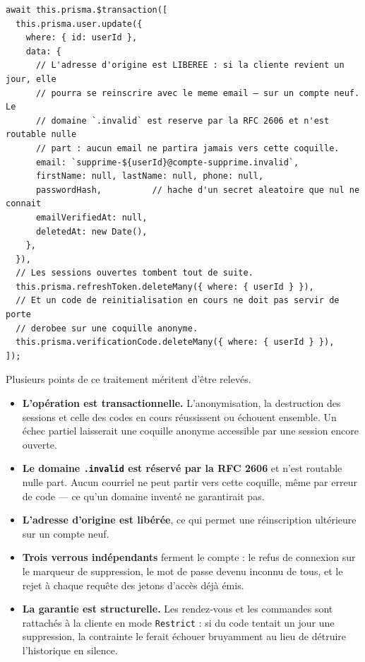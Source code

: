 \begin{lstlisting}[caption={Anonymisation d'un compte : ce qui est effacé, ce qui survit},captionpos=b]
await this.prisma.$transaction([
  this.prisma.user.update({
    where: { id: userId },
    data: {
      // L'adresse d'origine est LIBEREE : si la cliente revient un jour, elle
      // pourra se reinscrire avec le meme email — sur un compte neuf. Le
      // domaine `.invalid` est reserve par la RFC 2606 et n'est routable nulle
      // part : aucun email ne partira jamais vers cette coquille.
      email: `supprime-${userId}@compte-supprime.invalid`,
      firstName: null, lastName: null, phone: null,
      passwordHash,          // hache d'un secret aleatoire que nul ne connait
      emailVerifiedAt: null,
      deletedAt: new Date(),
    },
  }),
  // Les sessions ouvertes tombent tout de suite.
  this.prisma.refreshToken.deleteMany({ where: { userId } }),
  // Et un code de reinitialisation en cours ne doit pas servir de porte
  // derobee sur une coquille anonyme.
  this.prisma.verificationCode.deleteMany({ where: { userId } }),
]);
\end{lstlisting}

Plusieurs points de ce traitement méritent d'être relevés.

\begin{itemize}[leftmargin=1.2cm]
  \item \textbf{L'opération est transactionnelle.} L'anonymisation, la
  destruction des sessions et celle des codes en cours réussissent ou échouent
  ensemble. Un échec partiel laisserait une coquille anonyme accessible par une
  session encore ouverte.

  \item \textbf{Le domaine \texttt{.invalid} est réservé par la RFC 2606} et
  n'est routable nulle part. Aucun courriel ne peut partir vers cette coquille,
  même par erreur de code --- ce qu'un domaine inventé ne garantirait pas.

  \item \textbf{L'adresse d'origine est libérée}, ce qui permet une
  réinscription ultérieure sur un compte neuf.

  \item \textbf{Trois verrous indépendants} ferment le compte : le refus de
  connexion sur le marqueur de suppression, le mot de passe devenu inconnu de
  tous, et le rejet à chaque requête des jetons d'accès déjà émis.

  \item \textbf{La garantie est structurelle.} Les rendez-vous et les commandes
  sont rattachés à la cliente en mode \texttt{Restrict} : si du code tentait un
  jour une suppression, la contrainte le ferait échouer bruyamment au lieu de
  détruire l'historique en silence.
\end{itemize}

